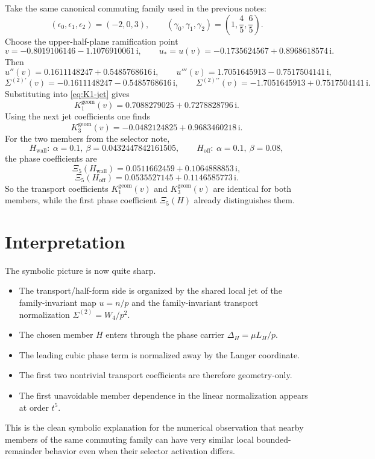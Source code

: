 \documentclass[11pt]{article}
\newcommand{\ii}{\mathrm i}
\newcommand{\pairgap}{\Delta}
\newcommand{\Kone}{K_1^{\mathrm{geom}}(v)}
\newcommand{\Kthree}{K_3^{\mathrm{geom}}(v)}
\begin{document}
Take the same canonical commuting family used in the previous notes:
\[
(\epsilon_0,\epsilon_1,\epsilon_2)=(-2,0,3),
\qquad
(\gamma_0,\gamma_1,\gamma_2)=\left(1,\frac45,\frac65\right).
\]
Choose the upper-half-plane ramification point
\[
 v=-0.8019106146-1.1076910061\,\ii,
 \qquad
 u_*=u(v)=-0.1735624567+0.8968618574\,\ii.
\]
Then
\[
 u''(v)=0.1611148247+0.5485768616\,\ii,
 \qquad
 u'''(v)=1.7051645913-0.7517504141\,\ii,
\]
\[
 \Sigma^{(2)\prime}(v)=-0.1611148247-0.5485768616\,\ii,
 \qquad
 \Sigma^{(2)\prime\prime}(v)=-1.7051645913+0.7517504141\,\ii.
\]
Substituting into \eqref{eq:K1-jet} gives
\[
 \boxed{\Kone = 0.7088279025+0.7278828796\,\ii.}
\]
Using the next jet coefficients one finds
\[
 \boxed{\Kthree = -0.0482124825+0.9683460218\,\ii.}
\]
For the two members from the selector note,
\[
 H_{\mathrm{wall}}:\ \alpha=0.1,\ \beta=0.0432447842161505,
 \qquad
 H_{\mathrm{off}}:\ \alpha=0.1,\ \beta=0.08,
\]
the phase coefficients are
\[
 \Xi_5(H_{\mathrm{wall}})=0.0511662459+0.1064888853\,\ii,
\]
\[
 \Xi_5(H_{\mathrm{off}})=0.0535527145+0.1146585773\,\ii.
\]
So the transport coefficients $\Kone$ and $\Kthree$ are identical for both members, while the first phase coefficient $\Xi_5(H)$ already distinguishes them.

\section{Interpretation}

The symbolic picture is now quite sharp.

\begin{itemize}
  \item The transport/half-form side is organized by the shared local jet of the family-invariant map $u=n/p$ and the family-invariant transport normalization $\Sigma^{(2)}=W_4/p^2$.
  \item The chosen member $H$ enters through the phase carrier $\pairgap_H=\mu L_H/p$.
  \item The leading cubic phase term is normalized away by the Langer coordinate.
  \item The first two nontrivial transport coefficients are therefore geometry-only.
  \item The first unavoidable member dependence in the linear normalization appears at order $t^5$.
\end{itemize}

This is the clean symbolic explanation for the numerical observation that nearby members of the same commuting family can have very similar local bounded-remainder behavior even when their selector activation differs.
\end{document}
